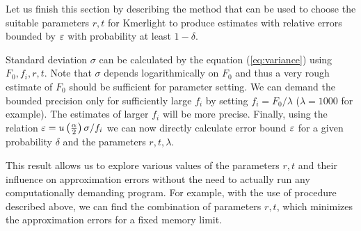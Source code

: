 \medskip

Let us finish this section by describing the method that can be used to choose the suitable
parameters $r, t$ for Kmerlight to produce estimates with relative errors bounded by $\varepsilon$
with probability at least $1 - \delta$. 

Standard deviation $\sigma$ can be calculated by the equation (\ref{eq:variance})
using $F_0, f_i, r, t$. Note that $\sigma$ depends logarithmically on $F_0$
and thus a very rough estimate of $F_0$ should be sufficient for parameter setting. 
We can demand the bounded precision only for sufficiently large $f_i$ by setting 
$f_i = F_0/\lambda$ ($\lambda=1000$ for example). The estimates of larger $f_i$ will
be more precise. Finally, using the relation 
$\varepsilon = u\left(\frac{\alpha}{2}\right)\sigma/f_i$ we can now directly calculate 
error bound $\varepsilon$ for a given probability $\delta$ and the parameters $r, t, \lambda$.

This result allows us to explore various values of the parameters $r, t$
and their influence on approximation errors without the need to actually 
run any computationally demanding program. For example, with the use of procedure described above,
we can find the combination of parameters $r, t$, which minimizes the approximation errors
for a fixed memory limit.

